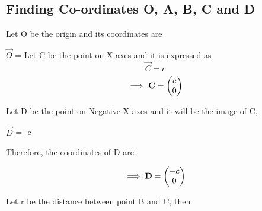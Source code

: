\documentclass[journal,10pt,twocolumn]{article}
\begin{document}
\subsection{Finding Co-ordinates O, A, B, C and D}
\begin{flushleft}
Let O be the origin and its coordinates are\\
\vspace{0.25cm}

\center
\vspace{0.4cm}
$\vec{O}$ = 
\endcenter{}
\vspace{0.25cm}
Let C be the point on X-axes and it is expressed as\\
\vspace{0.25cm}
\begin{equation}
    \vec{C} = c
    \end{equation}
\begin{equation}
\implies \mathbf{C}= \begin{pmatrix}c \\ 0\end{pmatrix}
\end{equation}

\vspace{0.25cm}
\begin{flushleft}
Let D be the point on Negative X-axes and it will be the image of C,\\
\begin{center}
$\vec{D}$  = -c\\
\end{center}
\vspace{0.2cm}
Therefore, the coordinates of D are\\
\end{flushleft}

\begin{equation}
\implies \mathbf{D}= \begin{pmatrix}-c \\ 0\end{pmatrix}
\end{equation}

\vspace{0.25cm}
\begin{flushleft}
Let r be the distance between point B and C, then\\
\end{flushleft}


\end{flushleft}
\end{document}
